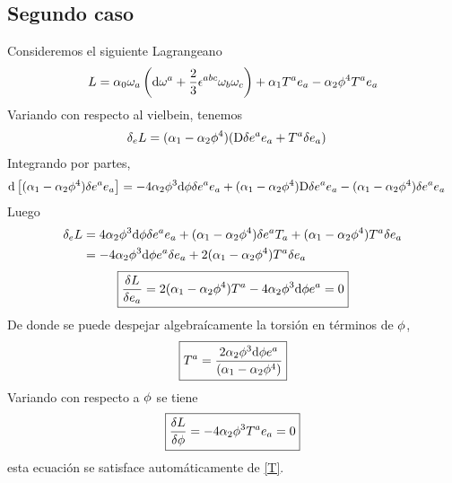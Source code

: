 \subsection{Segundo caso}
Consideremos el siguiente Lagrangeano
\begin{equation}
  L=\alpha_0\omega_{a}\left(\dd\omega^{a}+\frac{2}{3}\epsilon^{abc}\omega_b\omega_c\right)+\alpha_1T^{a}e_a-\alpha_2\phi^4T^{a}e_a
\end{equation}
Variando con respecto al vielbein, tenemos
\begin{align}
  \delta_eL&=(\alpha_1-\alpha_2\phi^4)(\mathrm{D}\delta e^{a}e_a+T^{a}\delta e_a)
\end{align}
Integrando por partes,\begin{align}
  \dd\left[(\alpha_1-\alpha_2\phi^4)\delta e^{a}e_a\right]&=-4\alpha_2\phi^3\dd\phi \delta e^{a}e_a+(\alpha_1-\alpha_2\phi^4)\mathrm{D}\delta e^{a}e_a-(\alpha_1-\alpha_2\phi^4)\delta e^{a}e_a
\end{align}
Luego
\begin{align}
  \delta_eL&=4\alpha_2\phi^3\dd\phi \delta e^{a}e_a+(\alpha_1-\alpha_2\phi^4)\delta e^{a}T_a+(\alpha_1-\alpha_2\phi^4)T^{a}\delta e_a\\
  &=-4\alpha_2\phi^3\dd\phi e^{a}\delta e_a+2(\alpha_1-\alpha_2\phi^4)T^{a}\delta e_a
\end{align}
\begin{equation}
 \boxed{ \frac{\delta L}{\delta e_a}=2(\alpha_1-\alpha_2\phi^4)T^{a}-4\alpha_2\phi^3\dd\phi e^{a}=0}
\end{equation}
De donde se puede despejar algebraícamente la torsión en términos de $\phi$,
\begin{equation}\label{T}
 \boxed{ T^{a}=\frac{2\alpha_2\phi^3\dd\phi e^{a}}{(\alpha_1-\alpha_2\phi^4)}}
\end{equation}
Variando con respecto a $\phi$ se tiene
\begin{equation}
  \boxed{\frac{\delta L}{\delta \phi }=-4\alpha_2\phi^3 T^{a}e_a=0}
\end{equation}
esta ecuación se satisface automáticamente de \eqref{T}.












